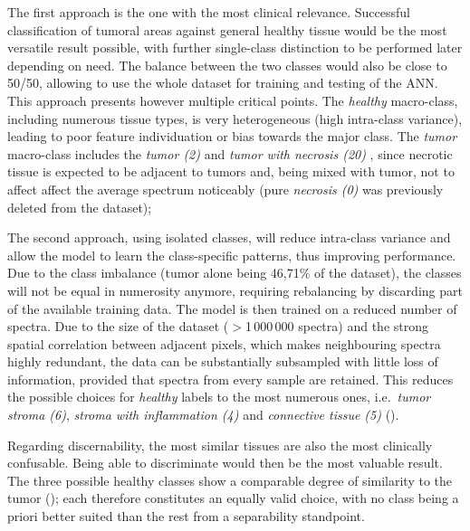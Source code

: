 The first approach is the one with the most clinical relevance. Successful classification of tumoral areas against general healthy tissue would be the most versatile result possible, with further single-class distinction to be performed later depending on need. The balance between the two classes would also be close to 50/50, allowing to use the whole dataset for training and testing of the ANN. This approach presents however multiple critical points.
The \textit{healthy} macro-class, including numerous tissue types, is very heterogeneous (high intra-class variance), leading to poor feature individuation or bias towards the major class.
The \textit{tumor} macro-class includes the \textit{tumor (2)} and \textit{tumor with necrosis (20)} , since necrotic tissue is expected to be adjacent to tumors and, being mixed with tumor, not to affect affect the average spectrum noticeably (pure \textit{necrosis (0)} was previously deleted from the dataset);


The second approach, using isolated classes, will reduce intra-class variance and allow the model to learn the class-specific patterns, thus improving performance.
Due to the class imbalance (tumor alone being 46,71\% of the dataset), the classes will not be equal in numerosity anymore, requiring rebalancing by discarding part of the available training data. The model is then trained on a reduced number of spectra. Due to the size of the dataset ($>$1\,000\,000 spectra) and the strong spatial correlation between adjacent pixels, which makes neighbouring spectra highly redundant, the data can be substantially subsampled with little loss of information, provided that spectra from every sample are retained. This reduces the possible choices for \textit{healthy} labels to the most numerous ones, i.e.\ \textit{tumor stroma (6)}, \textit{stroma with inflammation (4)} and \textit{connective tissue (5)} ().

Regarding discernability, the most similar tissues are also the most clinically confusable. Being able to discriminate would then be the most valuable result. The three possible healthy classes show a comparable degree of similarity to the tumor (); each therefore constitutes an equally valid choice, with no class being a priori better suited than the rest from a separability standpoint.

